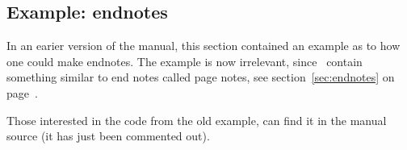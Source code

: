 {{{{

\subsection{Example: endnotes}

\begin{itshape}
  In an earier version of the manual, this section contained an
  example as to how one could make endnotes. The example is now
  irrelevant, since \theclass\ contain something similar to end notes
  called page notes, see section~\ref{sec:endnotes} on
  page~\pageref{sec:endnotes}. 

  Those interested in the code from the old example, can find it in
  the manual source (it has just been commented out).
\end{itshape}

\begin{comment}
\index{endnotes|(}

    Books like biographies often quote sources for quotations by the subject,
or sources for statements of fact and so on, at the end of the book or chapter.
These are often like a collected set of footnotes. The example shows
a somewhat rough and ready approach to implementing endnotes.

    Typically endnotes come in one of two forms: they are like a normal
footnote, except that the note text is on another page, or; there is
no mark in the body of the text and the note is identified via a small
quote from the text and its page number. 
The example is for the footnote-like form and for endnotes collected
at the end of the document, with an appropriate heading to distinguish
notes from different chapters.

     We have to be careful in choosing names for the macros we will be
defining for endnotes. Remember, you cannot use \cmd{\newcommand}
to define a new command whose name starts \cs{end...}, so \cs{endnote} 
appears to be out.
However, the \tx\ primitive \cmd{\def} command does let you define
a command starting with \cs{end...}. The syntax of the \cmd{\def} command, 
like 
that of many of \tx\ macros, looks strange to \ltx\ eyes. The major
disadvantage in using \cmd{\def} is that it will merrily overwrite any
previous definition with the same name (the \ltx\ \cmd{\newcommand} won't
let you do that). I could use \cmd{\def} for an \cs{endnote} macro, like
\begin{lcode}
\long\def\endnote#1{...}
\end{lcode}
I won't do that, though, as there is at least one \ltx\ class that includes
a \texttt{note} environment and that means that \cs{endnote} is already defined
in that class. To avoid potential pitfalls like that I'll use \cs{enote}
rather than the more evocative \cs{endnote}.


\end{comment}}}}}
